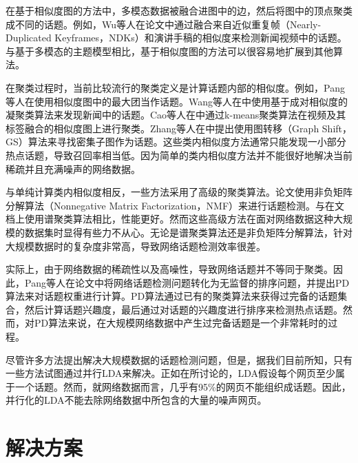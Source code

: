 在基于相似度图的方法中，多模态数据被融合进图中的边，然后将图中的顶点聚类成不同的话题。例如，Wu等人在论文\citep{wu-2007-crosslingual}中通过融合来自近似重复帧（Nearly-Duplicated Keyframes，NDKs）和演讲手稿的相似度来检测新闻视频中的话题。与基于多模态的主题模型相比，基于相似度图的方法可以很容易地扩展到其他算法\citep{cao-2011-tracking,aiello-2013-sensing,papadopoulos-2011-cluster}。

在聚类过程时，当前比较流行的聚类定义是计算话题内部的相似度。例如，Pang等人在\citep{pang-2013-unsupervised}使用相似度图中的最大团当作话题。Wang等人在\citep{wang2008automatic}中使用基于成对相似度的凝聚类算法来发现新闻中的话题。Cao等人在\citep{cao-2011-tracking}中通过k-means聚类算法在视频及其标签融合的相似度图上进行聚类。Zhang等人在\citep{zhang2013cross}中提出使用图转移（Graph Shift，GS）\citep{liu2010graphshift}算法来寻找密集子图作为话题。这些类内相似度方法通常只能发现一小部分热点话题，导致召回率相当低。因为简单的类内相似度方法并不能很好地解决当前稀疏并且充满噪声的网络数据。

与单纯计算类内相似度相反，一些方法采用了高级的聚类算法。论文\citep{xu2003document}使用非负矩阵分解算法（Nonnegative Matrix Factorization，NMF）来进行话题检测。与在文档上使用谱聚类算法相比，性能更好。然而这些高级方法在面对网络数据这种大规模的数据集时显得有些力不从心。无论是谱聚类算法还是非负矩阵分解算法，针对大规模数据时的复杂度非常高，导致网络话题检测效率很差。

实际上，由于网络数据的稀疏性以及高噪性，导致网络话题并不等同于聚类\citep{cao-2011-tracking}。因此，Pang等人在论文\cite{pang-2013-unsupervised}中将网络话题检测问题转化为无监督的排序问题，并提出PD算法来对话题权重进行计算。PD算法通过已有的聚类算法\citep{yang2012clustering,li2007noise}来获得过完备的话题集合，然后计算话题兴趣度，最后通过对话题的兴趣度进行排序来检测热点话题。然而，对PD算法来说，在大规模网络数据中产生过完备话题是一个非常耗时的过程\citep{pang-2013-unsupervised,pang-tao-2016-lpd}。

尽管许多方法提出解决大规模数据的话题检测问题，但是，据我们目前所知，只有一些方法试图通过并行LDA\citep{chen-2015-WarpLDA,wang-2009-PLDA,Liu-2011-PLDA+}来解决。正如在\citep{pang-2013-unsupervised,pang-tao-2016-lpd}所讨论的，LDA假设每个网页至少属于一个话题。然而，就网络数据而言，几乎有95\%的网页不能组织成话题。因此，并行化的LDA不能去除网络数据中所包含的大量的噪声网页。



\section{解决方案}

